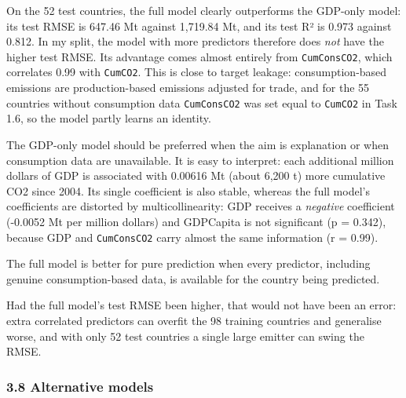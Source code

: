 \documentclass[
]{article}
\begin{document}
On the 52 test countries, the full model clearly outperforms the
GDP-only model: its test RMSE is 647.46 Mt against 1,719.84 Mt, and its
test R² is 0.973 against 0.812. In my split, the model with more
predictors therefore does \emph{not} have the higher test RMSE. Its
advantage comes almost entirely from \texttt{CumConsCO2}, which
correlates 0.99 with \texttt{CumCO2}. This is close to target leakage:
consumption-based emissions are production-based emissions adjusted for
trade, and for the 55 countries without consumption data
\texttt{CumConsCO2} was set equal to \texttt{CumCO2} in Task 1.6, so the
model partly learns an identity.

The GDP-only model should be preferred when the aim is explanation or
when consumption data are unavailable. It is easy to interpret: each
additional million dollars of GDP is associated with 0.00616 Mt (about
6,200 t) more cumulative CO2 since 2004. Its single coefficient is also
stable, whereas the full model's coefficients are distorted by
multicollinearity: GDP receives a \emph{negative} coefficient (-0.0052
Mt per million dollars) and GDPCapita is not significant (p = 0.342),
because GDP and \texttt{CumConsCO2} carry almost the same information (r
= 0.99).

The full model is better for pure prediction when every predictor,
including genuine consumption-based data, is available for the country
being predicted.

Had the full model's test RMSE been higher, that would not have been an
error: extra correlated predictors can overfit the 98 training countries
and generalise worse, and with only 52 test countries a single large
emitter can swing the RMSE.

\subsubsection{3.8 Alternative models}\label{alternative-models}
\end{document}
